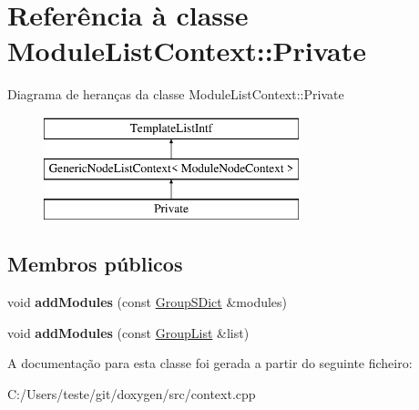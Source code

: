 \hypertarget{class_module_list_context_1_1_private}{\section{Referência à classe Module\-List\-Context\-:\-:Private}
\label{class_module_list_context_1_1_private}
}
Diagrama de heranças da classe Module\-List\-Context\-:\-:Private\begin{figure}[H]
\begin{center}
\leavevmode
\includegraphics[height=3.000000cm]{class_module_list_context_1_1_private}
\end{center}
\end{figure}
\subsection*{Membros públicos}
\begin{DoxyCompactItemize}
\item 
\hypertarget{class_module_list_context_1_1_private_a53e0bb31712942c05c6b5b87cc72b248}{void {\bfseries add\-Modules} (const \hyperlink{class_group_s_dict}{Group\-S\-Dict} \&modules)}\label{class_module_list_context_1_1_private_a53e0bb31712942c05c6b5b87cc72b248}

\item 
\hypertarget{class_module_list_context_1_1_private_a2ed3749f8589379385afb5e950ab5309}{void {\bfseries add\-Modules} (const \hyperlink{class_group_list}{Group\-List} \&list)}\label{class_module_list_context_1_1_private_a2ed3749f8589379385afb5e950ab5309}

\end{DoxyCompactItemize}


A documentação para esta classe foi gerada a partir do seguinte ficheiro\-:\begin{DoxyCompactItemize}
\item 
C\-:/\-Users/teste/git/doxygen/src/context.\-cpp\end{DoxyCompactItemize}
